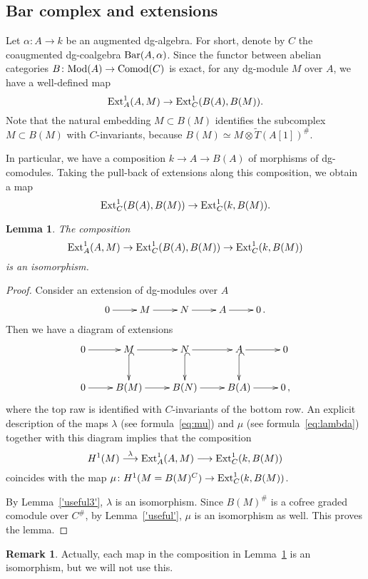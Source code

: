 \documentclass[10pt,russian]{article}
\theoremstyle{plain}
\newtheorem{lemma}[theorem]{Lemma}
\theoremstyle{definition}
\newtheorem{rem}[theorem]{Remark}
\newcommand{\Barr}{{\rm Bar}}
\newcommand{\Mod}{{\rm Mod}}
\newcommand{\Comod}{{\rm Comod}}
\newcommand{\Ext}{{\rm Ext}}
\begin{document}
\subsection{Bar complex and extensions}

Let $\alpha\colon A\to k$ be an augmented dg-algebra. For short, denote by $C$ the coaugmented dg-coalgebra $\Barr(A,\alpha)$.
Since the functor between abelian categories ${B\colon\Mod(A)\to \Comod(C)}$ is exact, for any dg-module $M$ over $A$, we have a well-defined map
$$
\Ext^1_A(A,M)\to \Ext^1_{C}(B(A),B(M)).
$$
Note that the natural embedding $M\subset B(M)$ identifies the subcomplex $M\subset B(M)$ with $C$-invariants, because $B(M) \simeq M\otimes \widetilde{T}(A[1])^{\#}$.

In particular, we have a composition $k\to A\to B(A)$ of morphisms of \mbox{dg-comodules}. Taking the pull-back of extensions along this composition, we obtain a map
$$
\Ext^1_{C}(B(A),B(M))\to \Ext^1_{C}(k,B(M)).
$$

\begin{lemma}\label{lemma:Bextensions}
The composition
$$
\Ext^1_A(A,M)\to \Ext^1_{C}(B(A),B(M))\to \Ext^1_{C}(k,B(M))
$$
is an isomorphism.
\end{lemma}
\begin{proof}
Consider an extension of dg-modules over $A$
$$
\xymatrix{
	 0 \ar[r] &  M\ar[r] & N\ar[r] & A \ar[r] & 0\,. \\
}
$$
Then we have a diagram of extensions
$$
\xymatrix{
	 0 \ar[r] &  M \ar[r]\ar@{^{(}->}[d] & N \ar[r]\ar@{^{(}->}[d] & A  \ar[r]\ar@{^{(}->}[d] & 0 \\
	0 \ar[r] & B(M) \ar[r] & B(N) \ar[r] & B(A) \ar[r] & 0\,,
}
$$
where the top raw is identified with $C$-invariants of the bottom row. An explicit description of the maps $\lambda$ (see formula~\eqref{eq:mu}) and $\mu$ (see formula~\eqref{eq:lambda}) together with this diagram implies that the composition
$$
H^1(M)\stackrel{\lambda}\longrightarrow \Ext^1_A(A,M)\longrightarrow \Ext^1_C(k,B(M))
$$
coincides with the map $\mu\colon H^1(M=B(M)^C)\to \Ext^1_C(k,B(M))$.

By Lemma~\ref{'useful3'}, $\lambda$ is an isomorphism. Since $B(M)^{\#}$ is a cofree graded comodule over $C^{\#}$, by Lemma~\ref{'useful'}, $\mu$ is an isomorphism as well. This proves the lemma.
\end{proof}

\begin{rem}
Actually, each map in the composition in Lemma~\ref{lemma:Bextensions} is an isomorphism, but we will not use this.
\end{rem}
\end{document}
